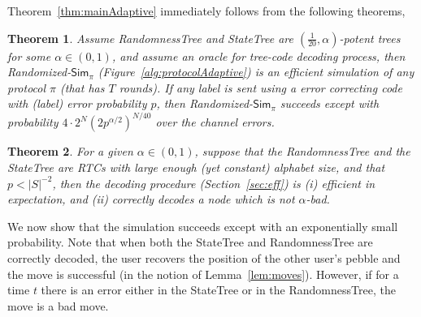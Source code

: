 \documentclass[ letterpaper, 11pt]{article}
\newtheorem{theorem}{Theorem}[section]
\newcommand{\statetree}{{\textsf{StateTree}}\xspace}
\newcommand{\randomtree}{{\textsf{RandomnessTree}}\xspace}
\newcommand{\potent}{potent\xspace}
\newcommand{\Sim}{{\mathsf{Sim}_\pi}}
\newcommand{\RTBC}{\textsf{RTC}\xspace}
\begin{document}
\vspace{0.5em plus 0.5em minus 0.2em}
Theorem~\ref{thm:mainAdaptive} immediately follows from the following theorems,
\begin{theorem}\label{thm:mainB}
Assume \randomtree and \statetree are $(\frac{1}{20},\alpha)$-\potent
trees for some $\alpha\in(0,1)$, and assume an oracle for tree-code decoding process,
then Randomized-$\Sim$ (Figure~\ref{alg:protocolAdaptive}) is an efficient simulation
of any protocol $\pi$ (that has $T$ rounds).
If any label is sent using a error correcting code with (label) error probability
$p$, then Randomized-$\Sim$
succeeds except with probability
$4\cdot2^N(2p^{\alpha/2})^{N/40}$ over the channel errors.
\end{theorem}
\begin{theorem}\label{thm:adaptiveEff}
For a given $\alpha\in(0,1)$, suppose that
the \randomtree and the \statetree are \RTBC{s} with
large enough (yet constant) alphabet size,  
and that $p < |S|^{-2}$,
then the decoding procedure (Section~\ref{sec:eff}) is
(i) efficient in expectation, and (ii) correctly decodes a node which is not $\alpha$-bad.
\end{theorem}

We now show that the simulation succeeds except with an exponentially small probability.
Note that when both the \statetree and \randomtree are correctly decoded,
the user recovers the position of the other user's pebble and the move
is successful (in the notion of Lemma~\ref{lem:moves}).
However, if for a time $t$ there is an error either in the \statetree or in the \randomtree,
the move is a bad move.
\end{document}
